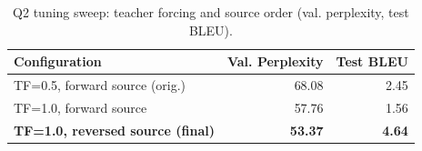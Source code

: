\begin{table}[htbp]
\centering
\scriptsize
\caption{Q2 tuning sweep: teacher forcing and source order (val. perplexity, test BLEU).}
\label{tab:q2tuning}
\begin{tabular}{lrr}
\hline
Configuration & Val. Perplexity & Test BLEU \\
\hline
TF=0.5, forward source (orig.) & 68.08 & 2.45 \\
TF=1.0, forward source & 57.76 & 1.56 \\
\textbf{TF=1.0, reversed source (final)} & \textbf{53.37} & \textbf{4.64} \\
\hline
\end{tabular}
\end{table}
